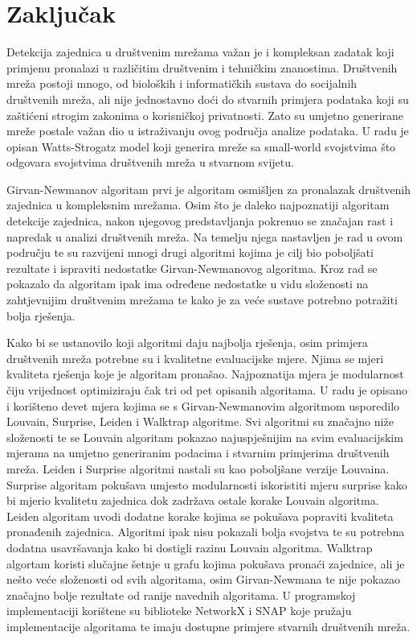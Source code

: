 \chapter{Zaključak}

Detekcija zajednica u društvenim mrežama važan je i kompleksan zadatak koji primjenu pronalazi u različitim društvenim i tehničkim znanostima. Društvenih mreža postoji mnogo, od bioloških i informatičkih sustava do socijalnih društvenih mreža, ali nije jednostavno doći do stvarnih primjera podataka koji su zaštićeni strogim zakonima o korisničkoj privatnosti. Zato su umjetno generirane mreže postale važan dio u istraživanju ovog područja analize podataka. U radu je opisan Watts-Strogatz model koji generira mreže sa small-world svojstvima što odgovara svojstvima društvenih mreža u stvarnom svijetu.

Girvan-Newmanov algoritam prvi je algoritam osmišljen za pronalazak društvenih zajednica u kompleksnim mrežama. Osim što je daleko najpoznatiji algoritam detekcije zajednica, nakon njegovog predstavljanja pokrenuo se značajan rast i napredak u analizi društvenih mreža. Na temelju njega nastavljen je rad u ovom području te su razvijeni mnogi drugi algoritmi kojima je cilj bio poboljšati rezultate i ispraviti nedostatke Girvan-Newmanovog algoritma. Kroz rad se pokazalo da algoritam ipak ima određene nedostatke u vidu složenosti na zahtjevnijim društvenim mrežama te kako je za veće sustave potrebno potražiti bolja rješenja.

Kako bi se ustanovilo koji algoritmi daju najbolja rješenja, osim primjera društvenih mreža potrebne su i kvalitetne evaluacijske mjere. Njima se mjeri kvaliteta rješenja koje je algoritam pronašao. Najpoznatija mjera je modularnost čiju vrijednost optimiziraju čak tri od pet opisanih algoritama. U radu je opisano i korišteno devet mjera kojima se s Girvan-Newmanovim algoritmom usporedilo Louvain, Surprise, Leiden i Walktrap algoritme. Svi algoritmi su značajno niže složenosti te se Louvain algoritam pokazao najuspješnijim na svim evaluacijskim mjerama na umjetno generiranim podacima i stvarnim primjerima društvenih mreža. Leiden i Surprise algoritmi nastali su kao poboljšane verzije Louvaina. Surprise algoritam pokušava umjesto modularnosti iskoristiti mjeru surprise kako bi mjerio kvalitetu zajednica dok zadržava ostale korake Louvain algoritma. Leiden algoritam uvodi dodatne korake kojima se pokušava popraviti kvaliteta pronađenih zajednica. Algoritmi ipak nisu pokazali bolja svojstva te su potrebna dodatna usavršavanja kako bi dostigli razinu Louvain algoritma. Walktrap algortam koristi slučajne šetnje u grafu kojima pokušava pronaći zajednice, ali je nešto veće složenosti od svih algoritama, osim Girvan-Newmana te nije pokazao značajno bolje rezultate od ranije navednih algoritama. U programskoj implementaciji korištene su biblioteke NetworkX i SNAP koje pružaju implementacije algoritama te imaju dostupne primjere stvarnih društvenih mreža.

